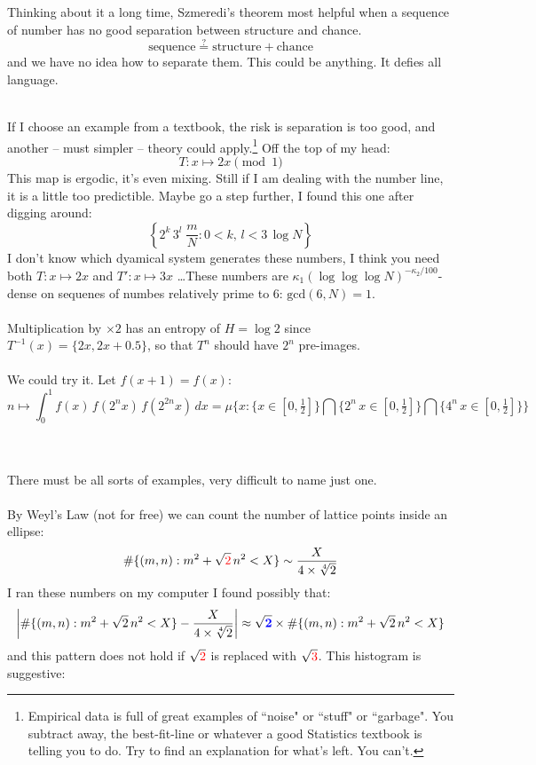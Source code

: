 \documentclass[12pt]{article}
\begin{document}
\noindent Thinking about it a long time, Szmeredi's theorem most helpful when a sequence of number has no good separation between structure and chance.
$$ \text{sequence} \stackrel{?}{=} \text{structure} + \text{chance} $$
and we have no idea how to separate them. This could be anything.  It defies all language.  \\ 
 \\ 
If I choose an example from a textbook, the risk is separation is too good, and another -- must simpler -- theory could apply.\footnote{Empirical data is full of great examples of ``noise" or ``stuff" or ``garbage".  You subtract away, the best-fit-line or whatever a good Statistics textbook is telling you to do.  Try to find an explanation for what's left.  You can't.  }   Off the top of my head:
$$ T : x \mapsto 2x \pmod 1$$
This map is ergodic, it's even mixing.  Still if I am dealing with the number line, it is a little too predictible.  Maybe go a step further, I found this one after digging around:
$$ \left\{ 2^k \, 3^l\; \frac{m}{N} : 0 < k, \, l < 3 \, \log N  \right\} $$ 
I don't know which dyamical system generates these numbers, I think you need both $T: x \mapsto 2x$ and $T': x \mapsto 3x$ \dots  These numbers are $\kappa_1 (\log \log \log N)^{-\kappa_2/100} $-dense on sequenes of numbes relatively prime to $6$:  $\text{gcd}(6, N) = 1$. \\ \\
Multiplication by $\times 2$ has an entropy of $H = \log 2$ since $T^{-1}(x) = \{ 2x , 2x + 0.5\}$, so that $T^n$ should have $2^n$ pre-images. \\ \\ 
We could try it.  Let $f(x+1)=f(x)$:
$$  n \mapsto \int_0^1 f(x) \, f( 2^n x ) \, f( 2^{2n} x ) \, dx  = \mu \Bigg\{ x : 
 \big\{  x \in [0, \tfrac{1}{2}] \big\} \bigcap 
 \big\{  2^n \, x \in [0, \tfrac{1}{2}] \big\} \bigcap
 \big\{  4^n \, x \in [0, \tfrac{1}{2}] \big\} \Bigg\} $$ \\ 
 \\ 
There must be all sorts of examples, very difficult to name just one. \\ \\
By Weyl's Law (not for free) we can count the number of lattice points inside an ellipse:
$$ \# \{ (m, n) : m^2 + \sqrt{\color{red}{2}} \, n^2 < X \} \sim \frac{X}{ 4 \times \sqrt[4]{2} } $$
I ran these numbers on my computer I found possibly that:
$$ \bigg| \# \{ (m, n) : m^2 + \sqrt{2} \, n^2 < X \} - \frac{X}{ 4 \times \sqrt[4]{2} }  \bigg| \approx { \sqrt{\color{blue}{\mathbf{2}}}} \times  \# \{ (m, n) : m^2 + \sqrt{2} \, n^2 < X \} $$
and this pattern does not hold if $\sqrt{\color{red}{2}}$ is replaced with $\sqrt{\color{red}{3}}$.  This histogram is suggestive: 
\end{document}
